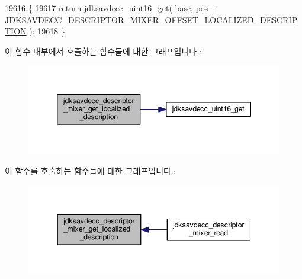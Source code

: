 \begin{DoxyCode}
19616 \{
19617     \textcolor{keywordflow}{return} \hyperlink{group__endian_ga3fbbbc20be954aa61e039872965b0dc9}{jdksavdecc\_uint16\_get}( base, pos + 
      \hyperlink{group__descriptor__mixer_ga89dc2305d7045c0aab85cfc41bc621cd}{JDKSAVDECC\_DESCRIPTOR\_MIXER\_OFFSET\_LOCALIZED\_DESCRIPTION}
       );
19618 \}
\end{DoxyCode}


이 함수 내부에서 호출하는 함수들에 대한 그래프입니다.\+:
\nopagebreak
\begin{figure}[H]
\begin{center}
\leavevmode
\includegraphics[width=346pt]{group__descriptor__mixer_gafc03dd5a79e12367dfddb5047d7a26e7_cgraph}
\end{center}
\end{figure}




이 함수를 호출하는 함수들에 대한 그래프입니다.\+:
\nopagebreak
\begin{figure}[H]
\begin{center}
\leavevmode
\includegraphics[width=344pt]{group__descriptor__mixer_gafc03dd5a79e12367dfddb5047d7a26e7_icgraph}
\end{center}
\end{figure}


